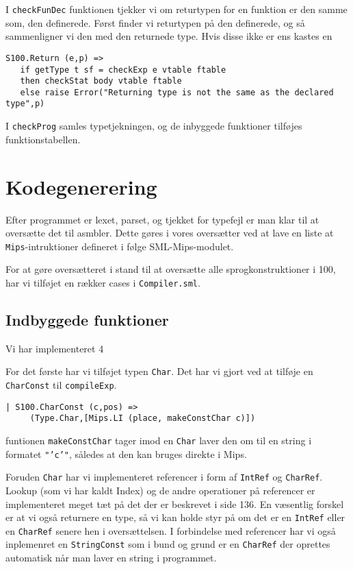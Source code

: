 \documentclass[12pt]{article}
\begin{document}
I \texttt{checkFunDec} funktionen tjekker vi om returtypen for en funktion er
den samme som, den definerede. Først finder vi returtypen på den definerede, og
så sammenligner vi den med den returnede type. Hvis disse ikke er ens kastes en

\begin{verbatim}
S100.Return (e,p) => 
   if getType t sf = checkExp e vtable ftable
   then checkStat body vtable ftable
   else raise Error("Returning type is not the same as the declared type",p)
\end{verbatim}

I \texttt{checkProg} samles typetjekningen, og de inbyggede funktioner tilføjes
funktionstabellen.

\section{Kodegenerering}
Efter programmet er lexet, parset, og tjekket for typefejl er man klar til at
oversætte det til asmbler. Dette gøres i vores oversætter ved at lave en liste
at \texttt{Mips}-intruktioner defineret i følge SML-Mips-modulet.

For at gøre oversætteret i stand til at oversætte alle sprogkonstruktioner i
100, har vi tilføjet en rækker cases i \texttt{Compiler.sml}.

\subsection{Indbyggede funktioner}
Vi har implementeret 4 



For det første har vi tilføjet typen \texttt{Char}. Det har vi gjort ved at
tilføje en \texttt{CharConst} til \texttt{compileExp}.

\begin{verbatim}
| S100.CharConst (c,pos) =>
     (Type.Char,[Mips.LI (place, makeConstChar c)])
\end{verbatim}

funtionen \texttt{makeConstChar} tager imod en \texttt{Char} laver den om til en
string i formatet \texttt{"'c'"}, således at den kan bruges direkte i Mips.

Foruden \texttt{Char} har vi implementeret referencer i form af \texttt{IntRef}
og \texttt{CharRef}. Lookup (som vi har kaldt Index) og de andre operationer på
referencer er implementeret meget tæt på det der er beskrevet i
\cite{Mogensen11} side 136. En væsentlig forskel er at vi også returnere en
type, så vi kan holde styr på om det er en \texttt{IntRef} eller en
\texttt{CharRef} senere hen i oversættelsen. I forbindelse med referencer har vi
også inplemenret en \texttt{StringConst} som i bund og grund er en
\texttt{CharRef} der oprettes automatisk når man laver en string i programmet.
\end{document}
